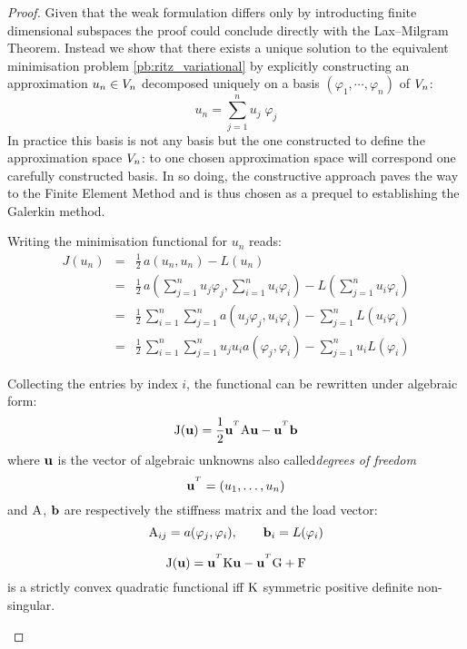 \begin{proof}
Given that the weak formulation differs only by introducting finite dimensional subspaces the proof could conclude directly with the Lax--Milgram Theorem.
Instead we show that there exists a unique solution to the equivalent minimisation problem \eqref{pb:ritz_variational} by explicitly constructing an approximation $u_n \in {V}_n$ decomposed uniquely on a basis $(\varphi_1,\cdots,\varphi_n)$ of ${V}_n$:
\begin{equation*}
u_n = \sum_{j=1}^{n} u_j\; \varphi_j
\end{equation*}
In practice this basis is not any basis but the one constructed to define the approximation space ${V}_n$: to one chosen approximation space will correspond one carefully constructed basis.
In so doing, the constructive approach paves the way to the Finite Element Method and is thus chosen as a prequel to establishing the Galerkin method.

\medskip
Writing the minimisation functional for $u_n$ reads:
\begin{eqnarray*}
J(u_n) &=& \frac{1}{2}\,a(u_n,u_n) - L(u_n) \\
       &=& \frac{1}{2}\,a(\sum_{j = 1}^{n} u_j \varphi_j,\sum_{i = 1}^{n} u_i \varphi_i) - L(\sum_{j = 1}^{n} u_i \varphi_i) \\
       &=& \frac{1}{2}\,\sum_{i = 1}^{n} \sum_{j = 1}^{n} a(u_j \varphi_j,u_i \varphi_i) - \sum_{j = 1}^{n}  L(u_i \varphi_i) \\
       &=& \frac{1}{2}\,\sum_{i = 1}^{n} \sum_{j = 1}^{n} u_j u_i a(\varphi_j, \varphi_i) - \sum_{j = 1}^{n} u_i L(\varphi_i)
\end{eqnarray*}

\medskip
Collecting the entries by index $i$, the functional can be rewritten under algebraic form:
\begin{equation*}
\matJ(\vecu) = \frac{1}{2} \vecu^\trans\matA \vecu - \vecu^\trans\vecb
\end{equation*}
where $\mathbf u$ is the vector of algebraic unknowns also called\textit{degrees of freedom}
\begin{equation*}
\vecu^\trans= (u_1,\dots,u_n)
\end{equation*}
and ${\mathrm A}$, $\mathbf b$ are respectively the stiffness matrix and the load vector:
\begin{equation*}
{\mathrm A}_{ij} = a(\varphi_j, \varphi_i),\qquad \mathbf b_{i} = L(\varphi_i)
\end{equation*}

\begin{prpstn}\label{prp:convexity_J}
\begin{equation*}
\matJ(\vecu) = \vecu^\trans\matK \vecu - \vecu^\trans \matG + \matF
\end{equation*}
is a strictly convex quadratic functional iff ${\mathrm K}$ symmetric positive definite non-singular.
\end{prpstn}


\end{proof}
